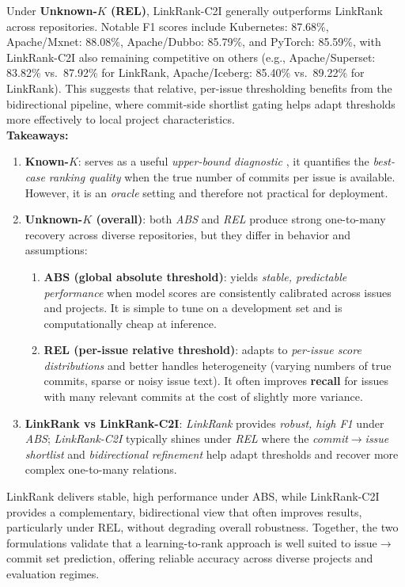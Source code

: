 \noindent
Under \textbf {Unknown-$K$ (REL)}, LinkRank-C2I generally outperforms LinkRank across repositories. Notable F1 scores include Kubernetes: 87.68\%, Apache/Mxnet: 88.08\%, Apache/Dubbo: 85.79\%, and PyTorch: 85.59\%, with LinkRank-C2I also remaining competitive on others (e.g., Apache/Superset: 83.82\% vs.\ 87.92\% for LinkRank, Apache/Iceberg: 85.40\% vs.\ 89.22\% for LinkRank). This suggests that relative, per-issue thresholding benefits from the bidirectional pipeline, where commit-side shortlist gating helps adapt thresholds more effectively to local project characteristics.\\

\noindent
\textbf{Takeaways:}
\begin{enumerate}
    \item \textbf{Known-$K$}: serves as a useful \emph{upper-bound diagnostic} ,  it quantifies the \emph{best-case ranking quality} when the true number of commits per issue is available. However, it is an \emph{oracle} setting and therefore not practical for deployment.
        \item \textbf{Unknown-$K$ (overall)}: both \emph{ABS} and \emph{REL} produce strong one-to-many recovery across diverse repositories, but they differ in behavior and assumptions:
            \begin{enumerate}
                \item \textbf{ABS (global absolute threshold)}: yields \emph{stable, predictable performance} when model scores are consistently calibrated across issues and projects. It is simple to tune on a development set and is computationally cheap at inference.
                \item \textbf{REL (per-issue relative threshold)}: adapts to \emph{per-issue score distributions} and better handles heterogeneity (varying numbers of true commits, sparse or noisy issue text). It often improves \textbf{recall} for issues with many relevant commits at the cost of slightly more variance.
            \end{enumerate}
        \item \textbf{LinkRank vs LinkRank-C2I}: \emph{LinkRank} provides \emph{robust, high F1} under \emph{ABS}; \emph{LinkRank-C2I} typically shines under \emph{REL} where the \emph{commit$\rightarrow$issue shortlist} and \emph{bidirectional refinement} help adapt thresholds and recover more complex one-to-many relations.
\end{enumerate}
LinkRank delivers stable, high performance under ABS, while LinkRank-C2I provides a complementary, bidirectional view 
that often improves results, particularly under REL, without degrading overall robustness. 
Together, the two formulations validate that a learning-to-rank approach is well suited to issue$\rightarrow$commit set prediction, offering reliable accuracy across diverse projects and evaluation regimes.

